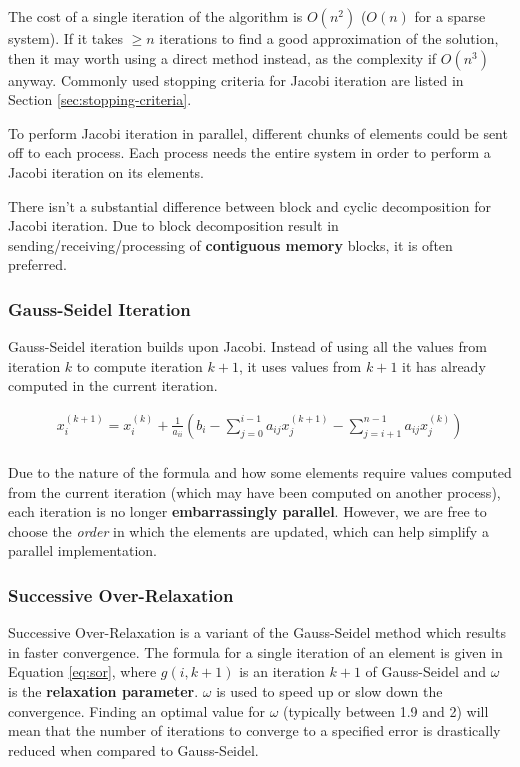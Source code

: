 \documentclass{article}
\begin{document}
The cost of a single iteration of the algorithm is $O(n^2)$ ($O(n)$ for a sparse system). If it takes $\geq n$ iterations to find a good approximation of the solution, then it may worth using a direct method instead, as the complexity if $O(n^3)$ anyway. Commonly used stopping criteria for Jacobi iteration are listed in Section \ref{sec:stopping-criteria}.

To perform Jacobi iteration in parallel, different chunks of elements could be sent off to each process. Each process needs the entire system in order to perform a Jacobi iteration on its elements.

There isn't a substantial difference between block and cyclic decomposition for Jacobi iteration. Due to block decomposition result in sending/receiving/processing of \textbf{contiguous memory} blocks, it is often preferred.

\subsubsection{Gauss-Seidel Iteration}

Gauss-Seidel iteration builds upon Jacobi. Instead of using all the values from iteration $k$ to compute iteration $k+1$, it uses values from $k+1$ it has already computed in the current iteration.

\begin{multline}
	x_i^{(k+1)} = x_i^{(k)} + \frac{1}{a_{ii}}(b_i - \sum_{j=0}^{i - 1} {a_{ij}x_{j}^{(k+1)}} - \sum_{j=i+1}^{n - 1} {a_{ij}x_{j}^{(k)}})
	\\
	\label{eq:gauss-seidel-elembyelem}
\end{multline}

Due to the nature of the formula and how some elements require values computed from the current iteration (which may have been computed on another process), each iteration is no longer \textbf{embarrassingly parallel}. However, we are free to choose the \textit{order} in which the elements are updated, which can help simplify a parallel implementation.

\subsubsection{Successive Over-Relaxation}

Successive Over-Relaxation is a variant of the Gauss-Seidel method which results in faster convergence. The formula for a single iteration of an element is given in Equation \ref{eq:sor}, where $g(i, k + 1)$ is an iteration $k + 1$ of Gauss-Seidel and $\omega$ is the \textbf{relaxation parameter}. $\omega$ is used to speed up or slow down the convergence. Finding an optimal value for $\omega$ (typically between 1.9 and 2) will mean that the number of iterations to converge to a specified error is drastically reduced when compared to Gauss-Seidel.
\end{document}
